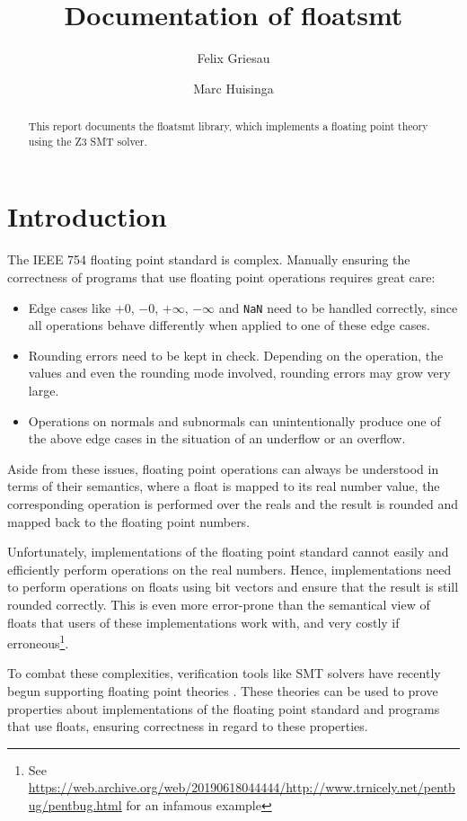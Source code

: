 \documentclass[a4paper,UKenglish,cleveref, autoref, thm-restate]{lipics-v2019}
\title{Documentation of floatsmt}
\author{Felix Griesau}{Karlsruhe Institute of Technology, Germany}{TODO}{}{}
\author{Marc Huisinga}{Karlsruhe Institute of Technology, Germany}{mhuisi@protonmail.com}{}{}
\begin{document}
\maketitle

\begin{abstract}
This report documents the floatsmt library, which implements a floating point theory using the Z3 SMT solver. 
\end{abstract}


\section{Introduction}
The IEEE 754 floating point standard \cite{ieee} is complex. Manually ensuring the correctness of programs that use floating point operations requires great care: 
\begin{itemize}
\item Edge cases like $+0$, $-0$, $+\infty$, $-\infty$ and \verb|NaN| need to be handled correctly, since all operations behave differently when applied to one of these edge cases.
\item Rounding errors need to be kept in check. Depending on the operation, the values and even the rounding mode involved, rounding errors may grow very large.
\item Operations on normals and subnormals can unintentionally produce one of the above edge cases in the situation of an underflow or an overflow.
\end{itemize}
Aside from these issues, floating point operations can always be understood in terms of their semantics, where a float is mapped to its real number value, the corresponding operation is performed over the reals and the result is rounded and mapped back to the floating point numbers.

Unfortunately, implementations of the floating point standard cannot easily and efficiently perform operations on the real numbers. Hence, implementations need to perform operations on floats using bit vectors and ensure that the result is still rounded correctly. This is even more error-prone than the semantical view of floats that users of these implementations work with, and very costly if erroneous\footnote{See \url{https://web.archive.org/web/20190618044444/http://www.trnicely.net/pentbug/pentbug.html} for an infamous example}. 

To combat these complexities, verification tools like SMT solvers have recently begun supporting floating point theories \cite{semantics}. These theories can be used to prove properties about implementations of the floating point standard and programs that use floats, ensuring correctness in regard to these properties.
\end{document}
